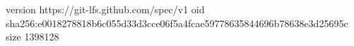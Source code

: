 version https://git-lfs.github.com/spec/v1
oid sha256:e0018278818b6c055d33d3cce06f5a4fcae59778635844696b78638e3d25695c
size 1398128
